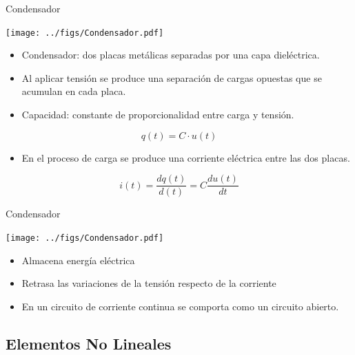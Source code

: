 \documentclass[xcolor={usenames,svgnames,dvipsnames}]{beamer}
\begin{document}
\begin{frame}[label={sec:orgda79999}]{Condensador}
\begin{center}
\texttt{[image: ../figs/Condensador.pdf]}
\end{center}

\begin{itemize}
\item \alert{Condensador}: dos placas metálicas separadas por una capa dieléctrica.

\item Al aplicar tensión se produce una \alert{separación de cargas opuestas que
se acumulan en cada placa}.

\item \alert{Capacidad}: constante de proporcionalidad entre carga y tensión.
\end{itemize}
\[
q(t) = C \cdot u(t)
\]

\begin{itemize}
\item En el proceso de carga se produce una corriente eléctrica entre las
dos placas.
\end{itemize}
\[
i(t)=\frac{dq(t)}{d(t)}=C\frac{du(t)}{dt}
\]
\end{frame}


\begin{frame}[label={sec:org67ce163}]{Condensador}
\begin{center}
\texttt{[image: ../figs/Condensador.pdf]}
\end{center}

\begin{itemize}
\item Almacena \alert{energía eléctrica}

\item \alert{Retrasa las variaciones de la tensión respecto de la corriente}

\item En un circuito de corriente continua se comporta como un circuito
abierto.
\end{itemize}
\end{frame}

\subsection{Elementos No Lineales}
\label{sec:org8e1efd8}
\end{document}
